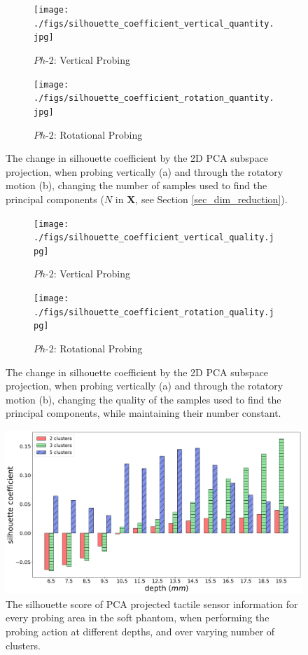 \documentclass[]{interact}
\theoremstyle{plain}%
\theoremstyle{definition}
\theoremstyle{remark}
\begin{document}
\begin{figure}[]
	\centering
	\begin{subfigure}[b]{.48\textwidth}
		\texttt{[image: ./figs/silhouette\_coefficient\_vertical\_quantity.jpg]}
		\caption{\tiny{$Ph\text{-}2$: Vertical Probing}}
		\label{silhouette_quantity:vertical}
	\end{subfigure}
	\begin{subfigure}[b]{.48\textwidth}
		\texttt{[image: ./figs/silhouette\_coefficient\_rotation\_quantity.jpg]}
		\caption{\tiny{$Ph\text{-}2$: Rotational Probing}}
		\label{silhouette_quantity:Rotation}
	\end{subfigure}
	\caption{The change in silhouette coefficient by the 2D PCA subspace projection, 
		when probing vertically (a) and through the rotatory motion (b), changing the number of samples 
		used to find the principal components ($N$ in $\mathbf{X}$, see Section \ref{sec_dim_reduction}). }
	\label{silhouette_quantity}
\end{figure}
\begin{figure}[]
	\centering
	\begin{subfigure}[b]{.48\textwidth}
		\texttt{[image: ./figs/silhouette\_coefficient\_vertical\_quality.jpg]}
		\caption{\tiny{$Ph\text{-}2$: Vertical Probing}}
		\label{silhouette_quality:vertical}
	\end{subfigure}
	\begin{subfigure}[b]{.48\textwidth}
		\texttt{[image: ./figs/silhouette\_coefficient\_rotation\_quality.jpg]}
		\caption{\tiny{$Ph\text{-}2$: Rotational Probing}}
		\label{silhouette_quality:Rotation}
	\end{subfigure}
	\caption{The change in silhouette coefficient by the 2D PCA subspace projection, 
		when probing vertically (a) and through the rotatory motion (b), changing the quality of the 
		samples used to find the principal components, while maintaining their number constant. }
	\label{silhouette_quality}
\end{figure}

\begin{figure}[]
	\centering
	\includegraphics[width=.78\textwidth]{./figs/bar_clst_num_change}
	\caption{The silhouette score of PCA projected tactile sensor information for every probing area in the 
		soft phantom, when performing the probing action at different depths, and over varying number of 
		clusters.}
	\label{clst_number}
\end{figure}
\end{document}
